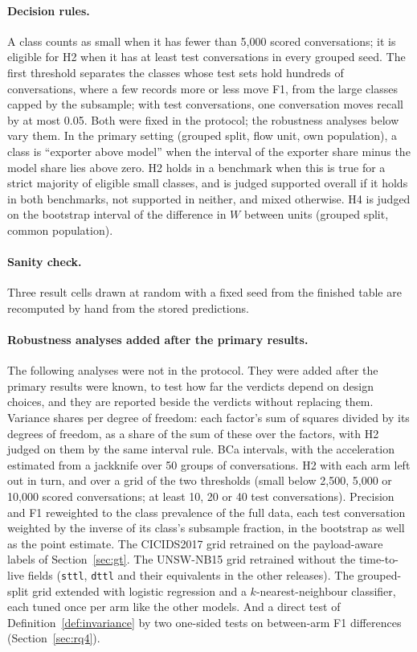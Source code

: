 \documentclass[pdflatex,sn-mathphys-num]{sn-jnl}
\newcommand{\setnum}[1]{#1}
\newcommand{\cicids}{CICIDS2017}
\theoremstyle{thmstyleone}%
\theoremstyle{thmstylethree}%
\begin{document}
\paragraph{Decision rules.} A class counts as small when it has fewer than \setnum{5{,}000} scored conversations; it is eligible for H2 when it has at least \SetMinTest{} test conversations in every grouped seed. The first threshold separates the classes whose test sets hold hundreds of conversations, where a few records more or less move F1, from the large classes capped by the subsample; with \SetMinTest{} test conversations, one conversation moves recall by at most \setnum{0.05}. Both were fixed in the protocol; the robustness analyses below vary them. In the primary setting (grouped split, flow unit, own population), a class is ``exporter above model'' when the interval of the exporter share minus the model share lies above zero. H2 holds in a benchmark when this is true for a strict majority of eligible small classes, and is judged supported overall if it holds in both benchmarks, not supported in neither, and mixed otherwise. H4 is judged on the bootstrap interval of the difference in $W$ between units (grouped split, common population).

\paragraph{Sanity check.} Three result cells drawn at random with a fixed seed from the finished table are recomputed by hand from the stored predictions.

\paragraph{Robustness analyses added after the primary results.} The following analyses were not in the protocol. They were added after the primary results were known, to test how far the verdicts depend on design choices, and they are reported beside the verdicts without replacing them. Variance shares per degree of freedom: each factor's sum of squares divided by its degrees of freedom, as a share of the sum of these over the factors, with H2 judged on them by the same interval rule. BCa intervals, with the acceleration estimated from a jackknife over \setnum{50} groups of conversations. H2 with each arm left out in turn, and over a grid of the two thresholds (small below \setnum{2{,}500}, \setnum{5{,}000} or \setnum{10{,}000} scored conversations; at least \setnum{10}, \setnum{20} or \setnum{40} test conversations). Precision and F1 reweighted to the class prevalence of the full data, each test conversation weighted by the inverse of its class's subsample fraction, in the bootstrap as well as the point estimate. The \cicids{} grid retrained on the payload-aware labels of Section~\ref{sec:gt}. The UNSW-NB15 grid retrained without the time-to-live fields (\texttt{sttl}, \texttt{dttl} and their equivalents in the other releases). The grouped-split grid extended with logistic regression and a $k$-nearest-neighbour classifier, each tuned once per arm like the other models. And a direct test of Definition~\ref{def:invariance} by two one-sided tests on between-arm F1 differences (Section~\ref{sec:rq4}).
\end{document}
